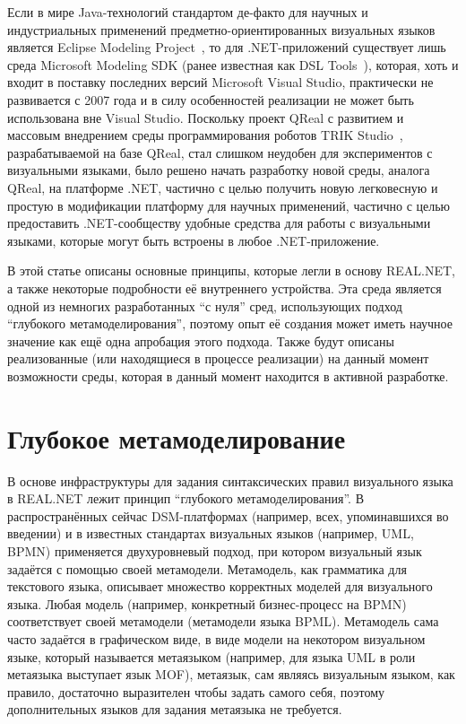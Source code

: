 \documentclass{spisok-article}
\begin{document}
Если в мире Java-технологий стандартом де-факто для научных и индустриальных применений предметно-ориентированных визуальных языков является Eclipse Modeling Project~\cite{gronback2009eclipse}, то для .NET-приложений существует лишь среда Microsoft Modeling SDK (ранее известная как DSL Tools~\cite{cook2007domain}), которая, хоть и входит в поставку последних версий Microsoft Visual Studio, практически не развивается с 2007 года и в силу особенностей реализации не может быть использована вне Visual Studio. Поскольку проект QReal с развитием и массовым внедрением среды программирования роботов TRIK Studio~\cite{litvinov2015trikstudio}, разрабатываемой на базе QReal, стал слишком неудобен для экспериментов с визуальными языками, было решено начать разработку новой среды, аналога QReal, на платформе .NET, частично с целью получить новую легковесную и простую в модификации платформу для научных применений, частично с целью предоставить .NET-сообществу удобные средства для работы с визуальными языками, которые могут быть встроены в любое .NET-приложение.

В этой статье описаны основные принципы, которые легли в основу REAL.NET, а также некоторые подробности её внутреннего устройства. Эта среда является одной из немногих разработанных ``с нуля'' сред, использующих подход ``глубокого метамоделирования'', поэтому опыт её создания может иметь научное значение как ещё одна апробация этого подхода. Также будут описаны реализованные (или находящиеся в процессе реализации) на данный момент возможности среды, которая в данный момент находится в активной разработке.

\section{Глубокое метамоделирование}

В основе инфраструктуры для задания синтаксических правил визуального языка в REAL.NET лежит принцип ``глубокого метамоделирования''. В распространённых сейчас DSM-платформах (например, всех, упоминавшихся во введении) и в известных стандартах визуальных языков (например, UML, BPMN) применяется двухуровневый подход, при котором визуальный язык задаётся с помощью своей метамодели. Метамодель, как грамматика для текстового языка, описывает множество корректных моделей для визуального языка. Любая модель (например, конкретный бизнес-процесс на BPMN) соответствует своей метамодели (метамодели языка BPML). Метамодель сама часто задаётся в графическом виде, в виде модели на некотором визуальном языке, который называется метаязыком (например, для языка UML в роли метаязыка выступает язык MOF), метаязык, сам являясь визуальным языком, как правило, достаточно выразителен чтобы задать самого себя, поэтому дополнительных языков для задания метаязыка не требуется.
\end{document}
